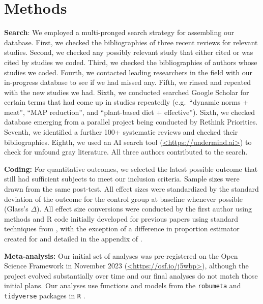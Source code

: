 \documentclass[sn-nature,pdflatex]{sn-jnl}
\begin{document}
\section{Methods}\label{sec3}

\textbf{Search}: We employed a multi-pronged search strategy for
assembling our database. First, we checked the bibliographies of three
recent reviews
\citep{mathur2021meta, bianchi2018conscious, bianchi2018restructuring}
for relevant studies. Second, we checked any possibly relevant study
that either cited or was cited by studies we coded. Third, we checked
the bibliographies of authors whose studies we coded. Fourth, we
contacted leading researchers in the field with our in-progress database
to see if we had missed any. Fifth, we rinsed and repeated with the new
studies we had. Sixth, we conducted searched Google Scholar for certain
terms that had come up in studies repeatedly (e.g.~``dynamic norms +
meat'', ``MAP reduction'', and ``plant-based diet + effective''). Sixth,
we checked database emerging from a parallel project being conducted by
Rethink Priorities. Seventh, we identified a further 100+ systematic
reviews and checked their bibliographies. Eighth, we used an AI search
tool (\url{<https://undermind.ai>}) to check for unfound gray
literature. All three authors contributed to the search.

\textbf{Coding:} For quantitative outcomes, we selected the latest
possible outcome that still had sufficient subjects to meet our
inclusion criteria. Sample sizes were drawn from the same post-test. All
effect sizes were standardized by the standard deviation of the outcome
for the control group at baseline whenever possible (Glass's
\(\Delta\)). All effect size conversions were conducted by the first
author using methods and R code initially developed for previous papers
\citep{paluck2019, paluck2021, porat2024} using standard techniques from
\citep{cooper2019}, with the exception of a difference in proportion
estimator created for \citep{paluck2021} and detailed in the appendix of
\citep{porat2024}.

\textbf{Meta-analysis:} Our initial set of analyses was pre-registered
on the Open Science Framework in November 2023
(\url{<https://osf.io/j5wbp>}), although the project evolved
substantially over time and our final analyses do not match those
initial plans. Our analyses use functions and models from the
\texttt{robumeta} \citep{fisher2015} and \texttt{tidyverse}
\citep{wickham2019} packages in \texttt{R} \citep{Rlang}.
\end{document}
